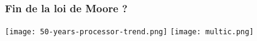 
\begingroup

\begin{frame}
  \frametitle{Fin de la loi de Moore ?}
  \begin{center}
    \texttt{[image: 50-years-processor-trend.png]}
    \texttt{[image: multic.png]}
  \end{center}
\end{frame}

\endgroup
\endinput
